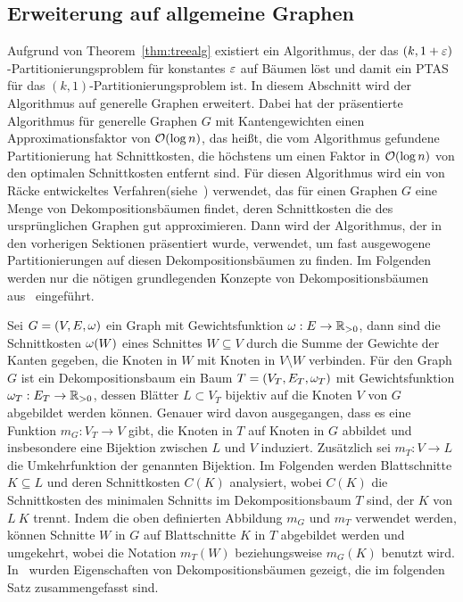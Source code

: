 \subsection{Erweiterung auf allgemeine Graphen}\label{sec:decomptrees}
Aufgrund von Theorem~\ref{thm:treealg} existiert ein Algorithmus, der das $(k,1+\varepsilon)$\hyp Partitionierungsproblem für konstantes $\varepsilon$ auf Bäumen löst und damit ein PTAS für das $(k,1)$\hyp Partitionierungsproblem ist.
In diesem Abschnitt wird der Algorithmus auf generelle Graphen erweitert.
Dabei hat der präsentierte Algorithmus für generelle Graphen $G$ mit Kantengewichten einen Approximationsfaktor von $\mathcal{O}(\log n)$, das heißt, die vom Algorithmus gefundene Partitionierung hat Schnittkosten, die höchstens um einen Faktor in $\mathcal{O}(\log n)$ von den optimalen Schnittkosten entfernt sind.
Für diesen Algorithmus wird ein von Räcke entwickeltes Verfahren(siehe~\parencite{rc08}) verwendet, das für einen Graphen $G$ eine Menge von Dekompositionsbäumen findet, deren Schnittkosten die des ursprünglichen Graphen gut approximieren. 
Dann wird der Algorithmus, der in den vorherigen Sektionen präsentiert wurde, verwendet, um fast ausgewogene Partitionierungen auf diesen Dekompositionsbäumen zu finden.
Im Folgenden werden nur die nötigen grundlegenden Konzepte von Dekompositionsbäumen aus~\parencite{rc08} eingeführt.

Sei $G = (V, E, \omega)$ ein Graph mit Gewichtsfunktion $\omega : E \rightarrow \mathbb{R}_{> 0}$, dann sind die Schnittkosten $\omega(W)$ eines Schnittes $W \subseteq V$ durch die Summe der Gewichte der Kanten gegeben, die Knoten in $W$ mit Knoten in $V \setminus W$ verbinden.
Für den Graph $G$ ist ein Dekompositionsbaum ein Baum $T=(V_T, E_T, \omega_T)$ mit Gewichtsfunktion $\omega_T : E_T \rightarrow \mathbb{R}_{> 0}$, dessen Blätter $L \subset V_T$ bijektiv auf die Knoten $V$ von $G$ abgebildet werden können.
Genauer wird davon ausgegangen, dass es eine Funktion $m_G : V_T \rightarrow V$ gibt, die Knoten in $T$ auf Knoten in $G$ abbildet und insbesondere eine Bijektion zwischen $L$ und $V$ induziert. 
Zusätzlich sei $m_T : V \rightarrow L$ die Umkehrfunktion der genannten Bijektion.
Im Folgenden werden Blattschnitte $K \subseteq L$ und deren Schnittkosten $C(K)$ analysiert, wobei $C(K)$ die Schnittkosten des minimalen Schnitts im Dekompositionsbaum $T$ sind, der $K$ von $L \ K$ trennt.
Indem die oben definierten Abbildung $m_G$ und $m_T$ verwendet werden, können Schnitte $W$ in $G$ auf Blattschnitte $K$ in $T$ abgebildet werden und umgekehrt, wobei die Notation $m_T(W)$ beziehungsweise $m_G(K)$ benutzt wird.
In~\parencite{rc08} wurden Eigenschaften von Dekompositionsbäumen gezeigt, die im folgenden Satz zusammengefasst sind.\\


